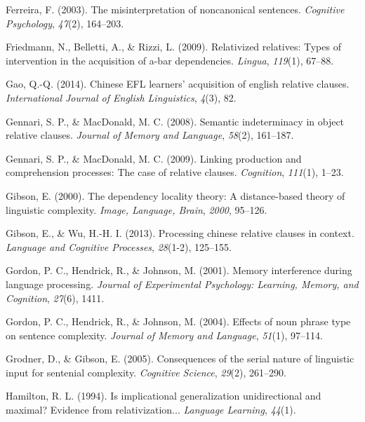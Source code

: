 \documentclass[
]{article}
\newlength{\cslhangindent}
\newenvironment{CSLReferences}[2] %
 {\begin{list}{}{%
  \setlength{\itemindent}{0pt}
  \setlength{\leftmargin}{0pt}
  \setlength{\parsep}{0pt}
  \ifodd #1
   \setlength{\leftmargin}{\cslhangindent}
   \setlength{\itemindent}{-1\cslhangindent}
  \fi
  \setlength{\itemsep}{#2\baselineskip}}}
 {\end{list}}
\begin{document}
\begin{CSLReferences}{1}{0}
Ferreira, F. (2003). The misinterpretation of noncanonical sentences.
\emph{Cognitive Psychology}, \emph{47}(2), 164--203.

Friedmann, N., Belletti, A., \& Rizzi, L. (2009). Relativized relatives:
Types of intervention in the acquisition of a-bar dependencies.
\emph{Lingua}, \emph{119}(1), 67--88.

Gao, Q.-Q. (2014). Chinese EFL learners' acquisition of english relative
clauses. \emph{International Journal of English Linguistics},
\emph{4}(3), 82.

Gennari, S. P., \& MacDonald, M. C. (2008). Semantic indeterminacy in
object relative clauses. \emph{Journal of Memory and Language},
\emph{58}(2), 161--187.

Gennari, S. P., \& MacDonald, M. C. (2009). Linking production and
comprehension processes: The case of relative clauses. \emph{Cognition},
\emph{111}(1), 1--23.

Gibson, E. (2000). The dependency locality theory: A distance-based
theory of linguistic complexity. \emph{Image, Language, Brain},
\emph{2000}, 95--126.

Gibson, E., \& Wu, H.-H. I. (2013). Processing chinese relative clauses
in context. \emph{Language and Cognitive Processes}, \emph{28}(1-2),
125--155.

Gordon, P. C., Hendrick, R., \& Johnson, M. (2001). Memory interference
during language processing. \emph{Journal of Experimental Psychology:
Learning, Memory, and Cognition}, \emph{27}(6), 1411.

Gordon, P. C., Hendrick, R., \& Johnson, M. (2004). Effects of noun
phrase type on sentence complexity. \emph{Journal of Memory and
Language}, \emph{51}(1), 97--114.

Grodner, D., \& Gibson, E. (2005). Consequences of the serial nature of
linguistic input for sentenial complexity. \emph{Cognitive Science},
\emph{29}(2), 261--290.

Hamilton, R. L. (1994). Is implicational generalization unidirectional
and maximal? Evidence from relativization... \emph{Language Learning},
\emph{44}(1).


\end{CSLReferences}
\end{document}
